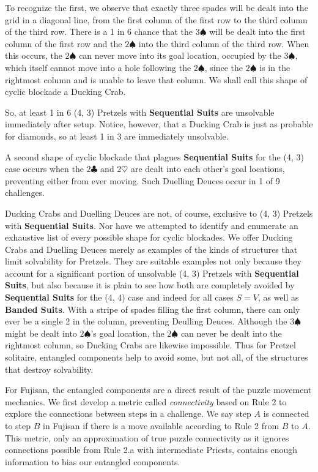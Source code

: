 \documentclass[journal]{IEEEtran}
\begin{document}
To recognize the first, we observe that exactly three spades will be dealt into the grid in a diagonal line, from the first column of the first row to the third column of the third row. There is a 1 in 6 chance that the $3\spadesuit$ will be dealt into the first column of the first row and the $2\spadesuit$ into the third column of the third row. When this occurs, the $2\spadesuit$ can never move into its goal location, occupied by the $3\spadesuit$, which itself cannot move into a hole following the $2\spadesuit$, since the $2\spadesuit$ is in the rightmost column and is unable to leave that column. We shall call this shape of cyclic blockade a Ducking Crab.

So, at least 1 in 6 (4, 3) Pretzels with \textbf{Sequential Suits} are unsolvable immediately after setup. Notice, however, that a Ducking Crab is just as probable for diamonds, so at least 1 in 3 are immediately unsolvable.

A second shape of cyclic blockade that plagues \textbf{Sequential Suits} for the (4, 3) case occurs when the $2\clubsuit$ and $2\heartsuit$ are dealt into each other's goal locations, preventing either from ever moving. Such Duelling Deuces occur in 1 of 9 challenges.

Ducking Crabs and Duelling Deuces are not, of course, exclusive to (4, 3) Pretzels with \textbf{Sequential Suits}. Nor have we attempted to identify and enumerate an exhaustive list of every possible shape for cyclic blockades. We offer Ducking Crabs and Duelling Deuces merely as examples of the kinds of structures that limit solvability for Pretzels. They are suitable examples not only because they account for a significant portion of unsolvable (4, 3) Pretzels with \textbf{Sequential Suits}, but also because it is plain to see how both are completely avoided by \textbf{Sequential Suits} for the (4, 4) case and indeed for all cases $S = V$, as well as \textbf{Banded Suits}. With a stripe of spades filling the first column, there can only ever be a single 2 in the column, preventing Deulling Deuces. Although the $3\spadesuit$ might be dealt into $2\spadesuit$'s goal location, the $2\spadesuit$ can never be dealt into the rightmost column, so Ducking Crabs are likewise impossible. Thus for Pretzel solitaire, entangled components help to avoid some, but not all, of the structures that destroy solvability.

For Fujisan, the entangled components are a direct result of the puzzle movement mechanics. We first develop a metric called {\it connectivity} based on Rule 2 to explore the connections between steps in a challenge. We say step $A$ is connected to step $B$ in Fujisan if there is a move available according to Rule 2 from $B$ to $A$. This metric, only an approximation of true puzzle connectivity as it ignores connections possible from Rule 2.a with intermediate Priests, contains enough information to bias our entangled components.
\end{document}
